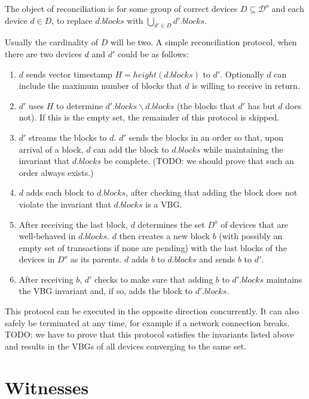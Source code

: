 \documentclass{article}
\begin{document}
The object of reconciliation is for some group of correct devices $D \subseteq \mathcal{D}^o$
and each device $d \in D$, 
to replace $d.\mathit{blocks}$ with $\bigcup_{d' \in D} d'.\mathit{blocks}$.

Usually the cardinality of $D$ will be two.  A simple reconciliation protocol,
when there are two devices $d$ and $d'$ could be as follows:

\begin{enumerate}
\item $d$ sends vector timestamp $H = \mathit{height}(d.\mathit{blocks})$ to $d'$.  Optionally $d$ can include the maximum number of blocks that $d$ is willing to receive in return.
\item $d'$ uses $H$ to determine $d'.\mathit{blocks} \backslash d.\mathit{blocks}$ (the blocks that $d'$ has but $d$ does not).  If this is the empty set, the remainder of this protocol is skipped.
\item $d'$ streams the blocks to $d$.  $d'$ sends the blocks in an order so that, upon arrival of a block, $d$ can add the block to $d.\mathit{blocks}$ while maintaining the invariant that $d.\mathit{blocks}$ be complete.  (TODO: we should prove that such an order always exists.)
\item $d$ adds each block to $d.\mathit{blocks}$, after checking that adding the block does not violate
the invariant that $d.\mathit{blocks}$ is a VBG.
\item After receiving the last block, $d$ determines the set $D^o$ of devices that are well-behaved in $d.\mathit{blocks}$.  $d$ then creates a new block $b$ (with possibly an empty set of transactions if none are pending) with the last blocks of the devices in $D^o$ as its parents.  $d$ adds $b$ to $d.\mathit{blocks}$ and sends $b$ to $d'$.
\item After receiving $b$, $d'$ checks to make sure that adding $b$ to $d'.\mathit{blocks}$ maintains the VBG invariant and, if so, adds the block to $d'.\mathit{blocks}$.
\end{enumerate}

This protocol can be executed in the opposite direction concurrently.
It can also safely be terminated at any time, for example if a network connection breaks.
TODO: we have to prove that this protocol satisfies the invariants listed above and results in
the VBGs of all devices converging to the same set.

\section{Witnesses}
\end{document}
